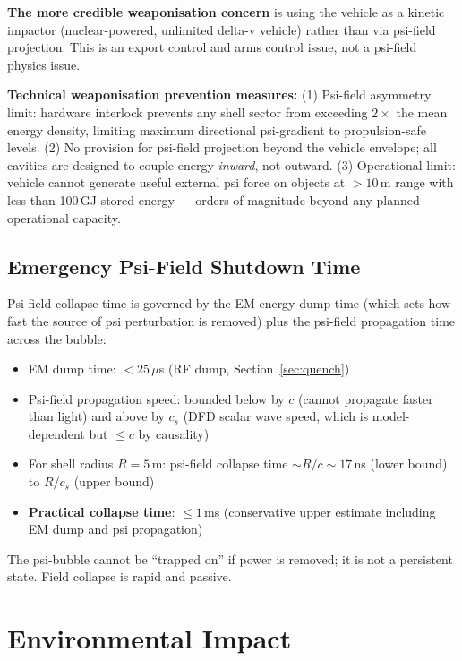 \documentclass[11pt,a4paper]{article}
\begin{document}
\textbf{The more credible weaponisation concern} is using the vehicle
as a kinetic impactor (nuclear-powered, unlimited delta-v vehicle) rather
than via psi-field projection. This is an export control and arms control
issue, not a psi-field physics issue.

\begin{mitigbox}
\textbf{Technical weaponisation prevention measures:}
(1) Psi-field asymmetry limit: hardware interlock prevents any shell
sector from exceeding $2\times$ the mean energy density, limiting
maximum directional psi-gradient to propulsion-safe levels.
(2) No provision for psi-field projection beyond the vehicle envelope;
all cavities are designed to couple energy \textit{inward}, not outward.
(3) Operational limit: vehicle cannot generate useful external psi
force on objects at $> 10$\,m range with less than 100\,GJ stored energy
--- orders of magnitude beyond any planned operational capacity.
\end{mitigbox}

\subsection{Emergency Psi-Field Shutdown Time}

Psi-field collapse time is governed by the EM energy dump time
(which sets how fast the source of psi perturbation is removed)
plus the psi-field propagation time across the bubble:
\begin{itemize}
  \item EM dump time: $< 25\,\mu$s (RF dump, Section~\ref{sec:quench})
  \item Psi-field propagation speed: bounded below by $c$ (cannot
    propagate faster than light) and above by $c_s$ (DFD scalar wave
    speed, which is model-dependent but $\leq c$ by causality)
  \item For shell radius $R = 5$\,m: psi-field collapse time
    $\sim R/c \sim 17$\,ns (lower bound) to $R/c_s$ (upper bound)
  \item \textbf{Practical collapse time}: $\leq 1$\,ms
    (conservative upper estimate including EM dump and psi propagation)
\end{itemize}

The psi-bubble cannot be ``trapped on'' if power is removed; it is
not a persistent state. Field collapse is rapid and passive.

\section{Environmental Impact}
\label{sec:environment}
\end{document}
